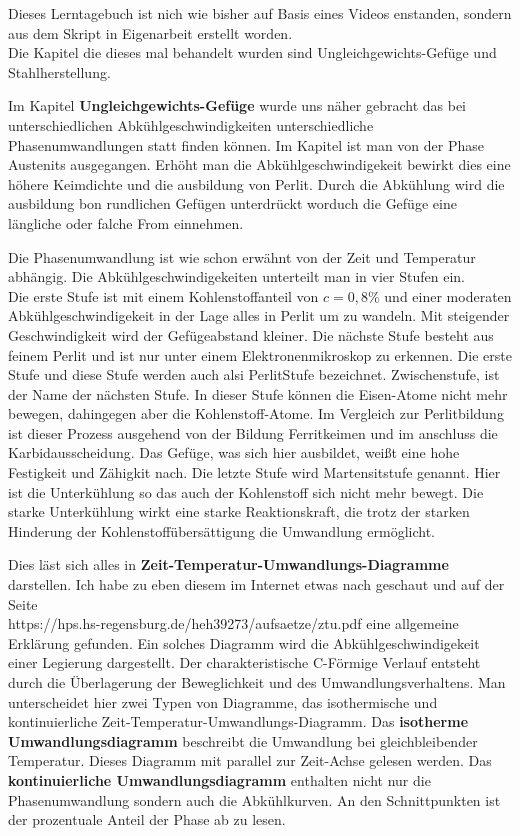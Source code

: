 \documentclass[12pt]{scrreprt}
\begin{document}
Dieses Lerntagebuch ist nich wie bisher auf Basis eines Videos enstanden, sondern aus dem Skript in Eigenarbeit erstellt worden.\\
Die Kapitel die dieses mal behandelt wurden sind Ungleichgewichts-Gefüge und Stahlherstellung.\medskip

Im Kapitel \textbf{Ungleichgewichts-Gefüge} wurde uns näher gebracht das bei unterschiedlichen Abkühlgeschwindigkeiten unterschiedliche Phasenumwandlungen statt finden können. Im Kapitel ist man von der Phase Austenits ausgegangen. Erhöht man die Abkühlgeschwindigekeit bewirkt dies eine höhere Keimdichte und die ausbildung von Perlit.
Durch die Abkühlung wird die ausbildung bon rundlichen Gefügen unterdrückt worduch die Gefüge eine längliche oder falche From einnehmen. \smallskip

Die Phasenumwandlung ist wie schon erwähnt von der Zeit und Temperatur abhängig. Die Abkühlgeschwindigekeiten  unterteilt man in vier Stufen ein.\\
Die erste Stufe ist mit einem Kohlenstoffanteil von \(c = 0,8\%\) und einer moderaten  Abkühlgeschwindigekeit in der Lage alles in Perlit um zu wandeln. Mit steigender Geschwindigkeit wird der Gefügeabstand kleiner. 
Die nächste Stufe besteht aus feinem Perlit und ist nur unter einem Elektronenmikroskop zu erkennen. Die erste Stufe und diese Stufe werden auch alsi PerlitStufe bezeichnet.
Zwischenstufe, ist der Name der nächsten Stufe. In dieser Stufe können die Eisen-Atome nicht mehr bewegen, dahingegen aber die Kohlenstoff-Atome. Im Vergleich zur Perlitbildung ist dieser Prozess ausgehend von der Bildung Ferritkeimen und im anschluss die Karbidausscheidung. Das Gefüge, was sich hier ausbildet, weißt eine hohe Festigkeit und Zähigkit nach.
Die letzte Stufe wird Martensitstufe genannt. Hier ist die Unterkühlung so das auch der Kohlenstoff sich nicht mehr bewegt. Die starke Unterkühlung wirkt eine starke Reaktionskraft, die trotz der starken Hinderung der Kohlenstoffübersättigung die Umwandlung ermöglicht.\medskip

Dies läst sich alles in \textbf{Zeit-Temperatur-Umwandlungs-Diagramme} darstellen. Ich habe zu eben diesem im Internet etwas nach geschaut und auf der Seite \\
https://hps.hs-regensburg.de/heh39273/aufsaetze/ztu.pdf eine allgemeine Erklärung gefunden. Ein solches Diagramm wird die Abkühlgeschwindigekeit einer Legierung dargestellt. Der charakteristische C-Förmige Verlauf entsteht durch die Überlagerung der Beweglichkeit und des Umwandlungsverhaltens. Man unterscheidet hier zwei Typen von Diagramme, das isothermische und kontinuierliche Zeit-Temperatur-Umwandlungs-Diagramm. 
Das \textbf{isotherme Umwandlungsdiagramm} beschreibt die Umwandlung bei gleichbleibender Temperatur. Dieses Diagramm mit parallel zur Zeit-Achse gelesen werden. 
Das \textbf{kontinuierliche Umwandlungsdiagramm}  enthalten nicht nur die Phasenumwandlung sondern auch die Abkühlkurven. An den Schnittpunkten ist der prozentuale Anteil der Phase ab zu lesen. \medskip
\end{document}
